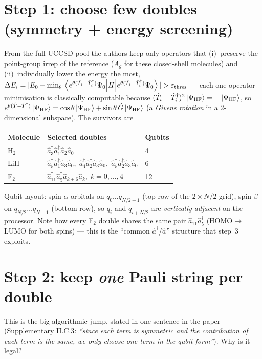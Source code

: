 \documentclass[11pt]{article}
\newcommand{\ad}[1]{\hat{a}^{\dagger}_{#1}}
\newcommand{\an}[1]{\hat{a}_{#1}}
\begin{document}
\section{Step 1: choose few doubles (symmetry + energy screening)}
From the full UCCSD pool the authors keep only operators that
(i)~preserve the point-group irrep of the reference
($A_g$ for these closed-shell molecules) and
(ii)~individually lower the energy the most,
$\Delta E_i=|E_0-\min_\theta\ev{H}{e^{\theta(\hat T_i-\hat T_i^\dagger)}\Psi_0}|
>\varepsilon_{\rm thres}$ --- each one-operator minimisation is classically
computable because $(\hat T_i-\hat T_i^\dagger)^2\ket{\Psi_{\rm HF}}=-\ket{\Psi_{\rm HF}}$,
so $e^{\theta(\hat T-\hat T^\dagger)}\ket{\Psi_{\rm HF}}
=\cos\theta\ket{\Psi_{\rm HF}}+\sin\theta\,\hat G\ket{\Psi_{\rm HF}}$
(a \emph{Givens rotation} in a 2-dimensional subspace).
The survivors are
\begin{center}
\begin{tabular}{lll}
\toprule
Molecule & Selected doubles & Qubits\\
\midrule
H$_2$ & $\ad{3}\ad{1}\an{2}\an{0}$ & 4\\
LiH   & $\ad{5}\ad{1}\an{3}\an{0},\;\ad{4}\ad{2}\an{3}\an{0},\;\ad{5}\ad{2}\an{3}\an{0}$ & 6\\
F$_2$ & $\ad{11}\ad{5}\an{k+6}\an{k},\;k=0,\dots,4$ & 12\\
\bottomrule
\end{tabular}
\end{center}
Qubit layout: spin-$\alpha$ orbitals on $q_0\dots q_{N/2-1}$ (top row of the
$2\times N/2$ grid), spin-$\beta$ on $q_{N/2}\dots q_{N-1}$ (bottom row), so
$q_i$ and $q_{i+N/2}$ are \emph{vertically adjacent} on the processor.
Note how every F$_2$ double shares the same pair $\ad{11}\ad{5}$
(HOMO$\to$LUMO for both spins) --- this is the ``common $\ad{}$/$\an{}$''
structure that step~3 exploits.

\section{Step 2: keep \emph{one} Pauli string per double}
This is the big algorithmic jump, stated in one sentence in the paper
(Supplementary II.C.3: \emph{``since each term is symmetric and the
contribution of each term is the same, we only choose one term in the qubit
form''}). Why is it legal?
\end{document}

